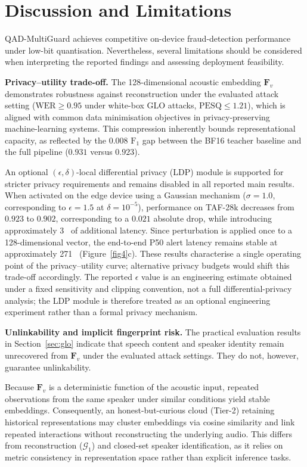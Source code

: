 \documentclass[a4paper,fleqn]{cas-sc}
\begin{document}
\section{Discussion and Limitations}\label{sec:discussion}

QAD-MultiGuard achieves competitive on-device fraud-detection performance under low-bit quantisation. Nevertheless, several limitations should be considered when interpreting the reported findings and assessing deployment feasibility.

\textbf{Privacy--utility trade-off.}
The 128-dimensional acoustic embedding $\mathbf{F}_v$ demonstrates robustness against reconstruction under the evaluated attack setting ($\text{WER} \ge 0.95$ under white-box GLO attacks, $\text{PESQ} \le 1.21$), which is aligned with common data minimisation objectives in privacy-preserving machine-learning systems. This compression inherently bounds representational capacity, as reflected by the $0.008$ $\text{F}_1$ gap between the BF16 teacher baseline and the full pipeline ($0.931$ versus $0.923$).

An optional $(\epsilon, \delta)$-local differential privacy (LDP) module is supported for stricter privacy requirements and remains disabled in all reported main results. When activated on the edge device using a Gaussian mechanism ($\sigma = 1.0$, corresponding to $\epsilon = 1.5$ at $\delta = 10^{-5}$), performance on TAF-28k decreases from $0.923$ to $0.902$, corresponding to a $0.021$ absolute drop, while introducing approximately 3~ of additional latency. Since perturbation is applied once to a 128-dimensional vector, the end-to-end P50 alert latency remains stable at approximately 271~ (Figure~\ref{fig4}c). These results characterise a single operating point of the privacy--utility curve; alternative privacy budgets would shift this trade-off accordingly. The reported $\epsilon$ value is an engineering estimate obtained under a fixed sensitivity and clipping convention, not a full differential-privacy analysis; the LDP module is therefore treated as an optional engineering experiment rather than a formal privacy mechanism.

\textbf{Unlinkability and implicit fingerprint risk.}
The practical evaluation results in Section~\ref{sec:glo} indicate that speech content and speaker identity remain unrecovered from $\mathbf{F}_v$ under the evaluated attack settings. They do not, however, guarantee unlinkability.

Because $\mathbf{F}_v$ is a deterministic function of the acoustic input, repeated observations from the same speaker under similar conditions yield stable embeddings. Consequently, an honest-but-curious cloud (Tier-2) retaining historical representations may cluster embeddings via cosine similarity and link repeated interactions without reconstructing the underlying audio. This differs from reconstruction ($\mathcal{G}_1$) and closed-set speaker identification, as it relies on metric consistency in representation space rather than explicit inference tasks.
\end{document}
